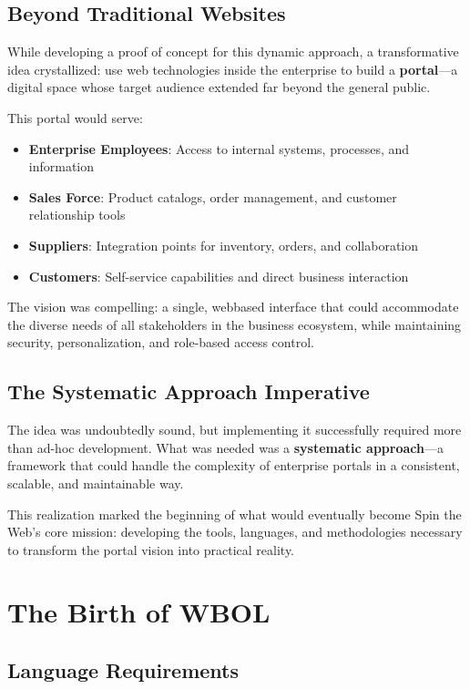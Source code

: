 \subsection{Beyond Traditional Websites}

While developing a proof of concept for this dynamic approach, a transformative idea crystallized: use web technologies inside the enterprise to build a \textbf{portal}—a digital space whose target audience extended far beyond the general public.

This portal would serve:
\begin{itemize}
\item \textbf{Enterprise Employees}: Access to internal systems, processes, and information
\item \textbf{Sales Force}: Product catalogs, order management, and customer relationship tools
\item \textbf{Suppliers}: Integration points for inventory, orders, and collaboration
\item \textbf{Customers}: Self-service capabilities and direct business interaction
\end{itemize}

The vision was compelling: a single, webbased interface that could accommodate the diverse needs of all stakeholders in the business ecosystem, while maintaining security, personalization, and role-based access control.

\subsection{The Systematic Approach Imperative}

The idea was undoubtedly sound, but implementing it successfully required more than ad-hoc development. What was needed was a \textbf{systematic approach}—a framework that could handle the complexity of enterprise portals in a consistent, scalable, and maintainable way.

This realization marked the beginning of what would eventually become Spin the Web's core mission: developing the tools, languages, and methodologies necessary to transform the portal vision into practical reality.

\section{The Birth of WBOL}

\subsection{Language Requirements}


